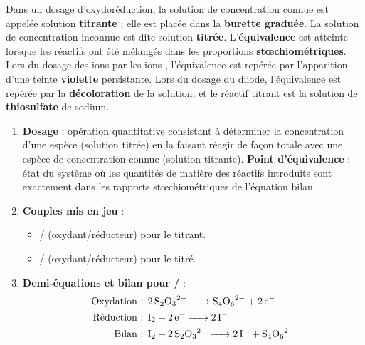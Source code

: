 \documentclass[11pt]{article}
\begin{document}
\begin{corrige}
Dans un dosage d'oxydoréduction, la solution de concentration connue est appelée solution \textbf{titrante} ; elle est placée dans la \textbf{burette graduée}. La solution de concentration inconnue est dite solution \textbf{titrée}. L'\textbf{équivalence} est atteinte lorsque les réactifs ont été mélangés dans les proportions \textbf{stœchiométriques}. Lors du dosage des ions  par les ions , l'équivalence est repérée par l'apparition d'une teinte \textbf{violette} persistante. Lors du dosage du diiode, l'équivalence est repérée par la \textbf{décoloration} de la solution, et le réactif titrant est la solution de \textbf{thiosulfate} de sodium.
\end{corrige}

\begin{corrige}
\begin{enumerate}
\item \textbf{Dosage} : opération quantitative consistant à déterminer la concentration d'une espèce (solution titrée) en la faisant réagir de façon totale avec une espèce de concentration connue (solution titrante). \textbf{Point d'équivalence} : état du système où les quantités de matière des réactifs introduits sont exactement dans les rapports stœchiométriques de l'équation bilan.
\item \textbf{Couples mis en jeu} :
\begin{itemize}
    \item {}/ (oxydant/réducteur) pour le titrant.
    \item {}/ (oxydant/réducteur) pour le titré.
\end{itemize}
\item \textbf{Demi-équations et bilan pour /} :
\begin{align*}
\text{Oxydation : } & \ce{2S2O3^2- -> S4O6^2- + 2e-} \\
\text{Réduction : } & \ce{I2 + 2e- -> 2I-} \\
\text{Bilan : } & \ce{I2 + 2S2O3^2- -> 2I- + S4O6^2-}
\end{align*}
\end{enumerate}
\end{corrige}
\end{document}
